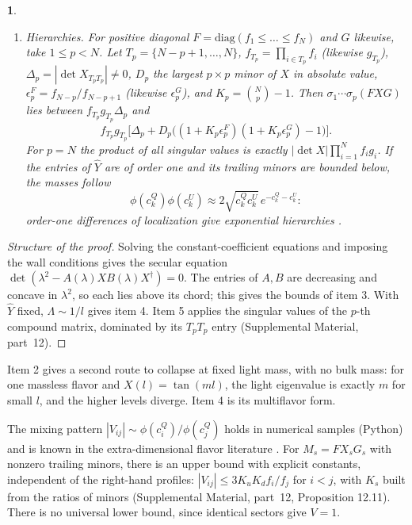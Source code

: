 \documentclass[aps,prd,reprint,onecolumn,nofootinbib,amsmath,amssymb,floatfix]{revtex4-2}
\theoremstyle{plain}
\newcommand{\resultname}{}
\newtheorem*{resultenv}{\resultname}
\newenvironment{result}[1]{\renewcommand{\resultname}{#1}\begin{resultenv}}{\end{resultenv}}
\newcommand{\supp}[1]{Supplemental Material, part~#1}
\begin{document}
\begin{result}{Theorem C}
\begin{enumerate}
\item \emph{Hierarchies.} For positive diagonal $F=\mathrm{diag}(f_1\le\dots\le f_N)$ and $G$ likewise, take $1\le p<N$. Let $T_p=\{N-p+1,\dots,N\}$, $f_{T_p}=\prod_{i\in T_p}f_i$ (likewise $g_{T_p}$), $\Delta_p=|\det X_{T_pT_p}|\neq0$, $D_p$ the largest $p\times p$ minor of $X$ in absolute value, $\epsilon^F_p=f_{N-p}/f_{N-p+1}$ (likewise $\epsilon^G_p$), and $K_p=\binom Np-1$. Then $\sigma_1\cdots\sigma_p(FXG)$ lies between $f_{T_p}g_{T_p}\Delta_p$ and
\begin{equation}
f_{T_p}g_{T_p}\bigl[\Delta_p+D_p\bigl((1+K_p\epsilon^F_p)(1+K_p\epsilon^G_p)-1\bigr)\bigr].
\end{equation}
For $p=N$ the product of all singular values is exactly $|\det X|\prod_{i=1}^N f_i g_i$. If the entries of $\hat Y$ are of order one and its trailing minors are bounded below, the masses follow
\begin{equation}
\phi(c^Q_k)\phi(c^U_k)\approx2\sqrt{c^Q_kc^U_k}\,e^{-c^Q_k-c^U_k}:
\end{equation}
order-one differences of localization give exponential hierarchies \cite{AHS2000,GP2000,GN2000}.
\end{enumerate}
\end{result}

\begin{proof}[Structure of the proof]
Solving the constant-coefficient equations and imposing the wall conditions gives the secular equation $\det(\lambda^2-A(\lambda)XB(\lambda)X^\dagger)=0$. The entries of $A,B$ are decreasing and concave in $\lambda^2$, so each lies above its chord; this gives the bounds of item 3. With $\hat Y$ fixed, $\Lambda\sim1/l$ gives item 4. Item 5 applies the singular values of the $p$-th compound matrix, dominated by its $T_pT_p$ entry (\supp{12}).
\end{proof}

Item 2 gives a second route to collapse at fixed light mass, with no bulk mass: for one massless flavor and $X(l)=\tan(ml)$, the light eigenvalue is exactly $m$ for small $l$, and the higher levels diverge. Item 4 is its multiflavor form.

The mixing pattern $|V_{ij}|\sim\phi(c^Q_i)/\phi(c^Q_j)$ holds in numerical samples (Python) and is known in the extra-dimensional flavor literature \cite{HS2001,APS2005}. For $M_s=FX_sG_s$ with nonzero trailing minors, there is an upper bound with explicit constants, independent of the right-hand profiles: $|V_{ij}|\le3K_uK_df_i/f_j$ for $i<j$, with $K_s$ built from the ratios of minors (\supp{12}, Proposition 12.11). There is no universal lower bound, since identical sectors give $V=1$.
\end{document}
